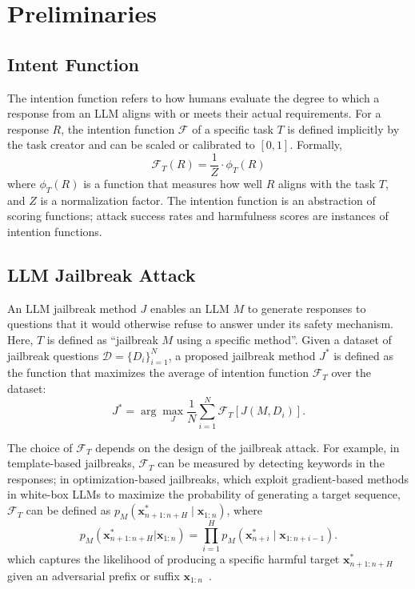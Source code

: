 \section{Preliminaries}

\subsection{Intent Function} 

The intention function refers to how humans evaluate the degree to which a response from an LLM aligns with or meets their actual requirements. For a response $R$, the intention function $\mathcal{F}$ of a specific task $T$ is defined implicitly by the task creator and can be scaled or calibrated to $[0,1]$. Formally,  
\begin{equation}
    \mathcal{F}_T(R) = \frac{1}{Z} \cdot \phi_T(R)
\end{equation}
where $\phi_T(R)$ is a function that measures how well $R$ aligns with the task $T$, and $Z$ is a normalization factor. The intention function is an abstraction of scoring functions; attack success rates and harmfulness scores are instances of intention functions.

\subsection{LLM Jailbreak Attack}

An LLM jailbreak method $J$ enables an LLM $M$ to generate responses to questions that it would otherwise refuse to answer under its safety mechanism. Here, $T$ is defined as ``jailbreak $M$ using a specific method''. Given a dataset of jailbreak questions $\mathcal{D} = \{D_i\}_{i=1}^{N}$, a proposed jailbreak method $J^*$ is defined as the function that maximizes the average of intention function $\mathcal{F}_T$ over the dataset:  
\begin{equation}
J^* = \arg\max_J \frac{1}{N} \sum_{i=1}^{N} \mathcal{F}_{T}[J(M,D_i)].
\end{equation}  

The choice of $\mathcal{F}_T$ depends on the design of the jailbreak attack. For example, in template-based jailbreaks, $\mathcal{F}_T$ can be measured by detecting keywords in the responses; in optimization-based jailbreaks, which exploit gradient-based methods in white-box LLMs to maximize the probability of generating a target sequence, $\mathcal{F}_T$ can be defined as $p_M(\bm{x}_{n+1:n+H}^* \mid \bm{x}_{1:n})$, where  
\begin{equation}
p_M(\bm{x}_{n+1:n+H}^* | \bm{x}_{1:n}) = \prod_{i=1}^{H} p_M(\bm{x}_{n+i}^* \mid \bm{x}_{1:n+i-1}).
\end{equation}  
which captures the likelihood of producing a specific harmful target $\bm{x}_{n+1:n+H}^*$ given an adversarial prefix or suffix $\bm{x}_{1:n}$~\cite{23gcg}.

